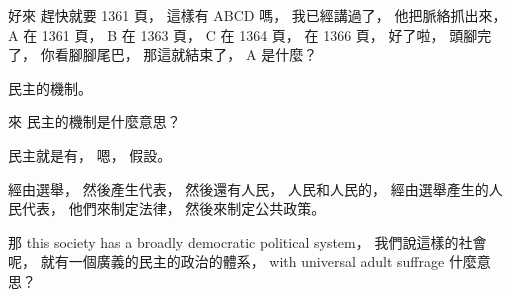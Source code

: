 \hypertarget{w06:cue:1305}{}好來 趕快就要 1361 頁，
\hypertarget{w06:cue:1306}{}這樣有 ABCD 嗎，
\hypertarget{w06:cue:1307}{}我已經講過了，
\hypertarget{w06:cue:1308}{}他把脈絡抓出來，
\hypertarget{w06:cue:1309}{}A 在 1361 頁，
\hypertarget{w06:cue:1310}{}B 在 1363 頁，
\hypertarget{w06:cue:1311}{}C 在 1364 頁，
\hypertarget{w06:cue:1312}{}在 1366 頁，
\hypertarget{w06:cue:1313}{}好了啦，
\hypertarget{w06:cue:1314}{}頭腳完了，
\hypertarget{w06:cue:1315}{}你看腳腳尾巴，
\hypertarget{w06:cue:1316}{}那這就結束了，
\hypertarget{w06:cue:1317}{}A 是什麼？

\hypertarget{w06:cue:1318}{}民主的機制。

\hypertarget{w06:cue:1319}{}來 民主的機制是什麼意思？

\hypertarget{w06:cue:1320}{}民主就是有，
\hypertarget{w06:cue:1321}{}嗯，
\hypertarget{w06:cue:1322}{}假設。

\hypertarget{w06:cue:1323}{}經由選舉，
\hypertarget{w06:cue:1324}{}然後產生代表，
\hypertarget{w06:cue:1325}{}然後還有人民，
\hypertarget{w06:cue:1326}{}人民和人民的，
\hypertarget{w06:cue:1327}{}經由選舉產生的人民代表，
\hypertarget{w06:cue:1328}{}他們來制定法律，
\hypertarget{w06:cue:1329}{}然後來制定公共政策。

\hypertarget{w06:cue:1330}{}那 this society has a broadly democratic political system，
\hypertarget{w06:cue:1331}{}我們說這樣的社會呢，
\hypertarget{w06:cue:1332}{}就有一個廣義的民主的政治的體系，
\hypertarget{w06:cue:1333}{}with universal adult suffrage
\hypertarget{w06:cue:1334}{}什麼意思？

